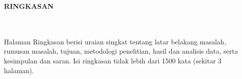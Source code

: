 \clearpage
{}%
\thispagestyle{fancy}

\begin{center}
	\large \bfseries \MakeUppercase{Ringkasan}\\
	\normalsize \normalfont {\thetitle}\\
	\normalsize \normalfont {\theauthor}\\
	\bigskip
	
	\normalsize \normalfont \justifying
	Halaman Ringkasan berisi uraian singkat tentang latar belakang masalah, rumusan masalah, tujuan, metodologi penelitian, hasil dan analisis data, serta kesimpulan dan saran. Isi ringkasan tidak lebih dari 1500 kata (sekitar 3 halaman).\par
	
	\vfill
	
\end{center}
\clearpage